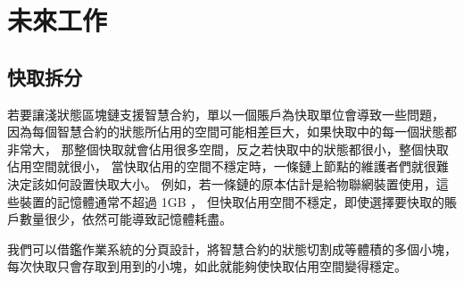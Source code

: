 \chapter{未來工作}
\label{c:future_work}

\section{快取拆分}

若要讓淺狀態區塊鏈支援智慧合約，單以一個賬戶為快取單位會導致一些問題，
因為每個智慧合約的狀態所佔用的空間可能相差巨大，如果快取中的每一個狀態都非常大，
那整個快取就會佔用很多空間，反之若快取中的狀態都很小，整個快取佔用空間就很小，
當快取佔用的空間不穩定時，一條鏈上節點的維護者們就很難決定該如何設置快取大小。
例如，若一條鏈的原本估計是給物聯網裝置使用，這些裝置的記憶體通常不超過 1GB ，
但快取佔用空間不穩定，即使選擇要快取的賬戶數量很少，依然可能導致記憶體耗盡。

我們可以借鑑作業系統的分頁設計，將智慧合約的狀態切割成等體積的多個小塊，
每次快取只會存取到用到的小塊，如此就能夠使快取佔用空間變得穩定。

